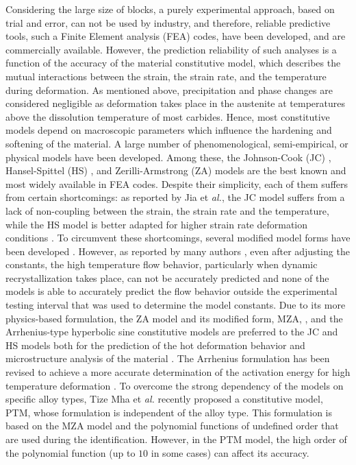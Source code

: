 \documentclass[twoside,english,1p,final,sort&compress]{elsarticle}
\makeatletter
\theoremstyle{plain}
\DeclareRobustCommand{\eal}{et \emph{al.}\@\xspace}
\makeatother
\begin{document}
Considering the large size of blocks, a purely experimental approach, based on trial and error, can not be used by industry, and  therefore, reliable predictive tools, such a Finite Element analysis (FEA) codes, have been developed, and are commercially available. However, the prediction reliability of such analyses is a function of the accuracy of the material constitutive model, which describes the mutual interactions between the strain, the strain rate, and the temperature during deformation. As mentioned above, precipitation and phase changes are considered negligible as deformation takes place in the austenite at temperatures above the dissolution temperature of most carbides. Hence, most constitutive models depend on macroscopic parameters which influence the hardening and softening of the material. A large number of phenomenological, semi-empirical, or physical models \cite{Rusinek-2010, Shin-2010, Lin-2011, Pantale-2021} have been developed. Among these, the Johnson-Cook (JC) \cite{Johnson-1983}, Hansel-Spittel (HS) \cite{chadha2018approach}, and Zerilli-Armstrong (ZA) \cite{Zerilli-1987} models are the best known and most widely available in FEA codes. Despite their simplicity, each of them suffers from certain shortcomings: as reported by Jia \eal \cite{Jia-2021}, the JC model suffers from a lack of non-coupling between the strain, the strain rate and the temperature,  while the HS model is better adapted for higher strain rate deformation conditions \cite{chadha2018approach}. To circumvent these shortcomings, several modified model forms have been developed \cite{chadha2018approach, Rule-1998, Vural-2003, Lin-2010, Lin-2012}. However, as reported by many authors \cite{Li-2013, Zhang-2015, Zhou-2019}, even after adjusting the constants, the high temperature flow behavior, particularly when dynamic recrystallization takes place, can not be accurately predicted and none of the models is able to accurately predict the flow behavior outside the experimental testing interval that was used to determine the model constants. Due to its more physics-based formulation, the ZA model and its modified form, MZA, \cite{NematNasser-2004, Lennon-2004, Muralli-2017, Cheng-2021, Muralli-2021}, and the Arrhenius-type hyperbolic sine constitutive models are preferred to the JC and HS  models both for the prediction of the hot deformation behavior and microstructure analysis of the material \cite{Jonas-1969, Mostafaei-2012, Zhang-2012}. The Arrhenius formulation has been revised to achieve a more accurate determination of the activation energy for high temperature deformation \cite{Slooff-2007, Lin-2008-C}. To overcome the strong dependency of the models on specific alloy types, Tize Mha \eal \cite{TizeMha-2022} recently proposed a constitutive model, PTM, whose formulation is independent of the alloy type. This formulation is based on the MZA model and the polynomial functions of undefined order that are used during the identification. However, in the PTM model, the high order of the polynomial function (up to $10$ in some cases) can affect its accuracy. 
\end{document}
